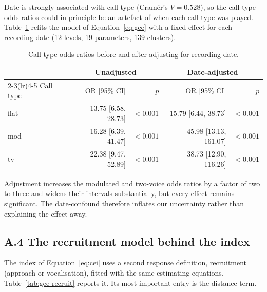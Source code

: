 Date is strongly associated with call type (Cram\'er's $V=0.528$), so the call-type odds ratios
could in principle be an artefact of when each call type was played. Table~\ref{tab:date-adj}
refits the model of Equation~\eqref{eq:gee} with a fixed effect for each recording date
(12 levels, 19 parameters, 139 clusters).

\begin{table}[htbp]
  \centering
  \caption{Call-type odds ratios before and after adjusting for recording date.}\label{tab:date-adj}
  \small
  \begin{tabular}{lrrrr}
    \toprule
    & \multicolumn{2}{c}{Unadjusted} & \multicolumn{2}{c}{Date-adjusted} \\
    \cmidrule(lr){2-3}\cmidrule(lr){4-5}
    Call type & OR [95\% CI] & $p$ & OR [95\% CI] & $p$ \\
    \midrule
    flat & 13.75 [6.58, 28.73] & $<0.001$ & 15.79 [6.44, 38.73] & $<0.001$ \\
    mod & 16.28 [6.39, 41.47] & $<0.001$ & 45.98 [13.13, 161.07] & $<0.001$ \\
    tv & 22.38 [9.47, 52.89] & $<0.001$ & 38.73 [12.90, 116.26] & $<0.001$ \\
    \bottomrule
  \end{tabular}
\end{table}

Adjustment increases the modulated and two-voice odds ratios by a factor of two to three and
widens their intervals substantially, but every effect remains significant. The date-confound
therefore inflates our uncertainty rather than explaining the effect away.

\subsection*{A.4 The recruitment model behind the index}

The index of Equation~\eqref{eq:cei} uses a second response definition, recruitment
(approach or vocalisation), fitted with the same estimating equations. Table~\ref{tab:gee-recruit}
reports it. Its most important entry is the distance term.

